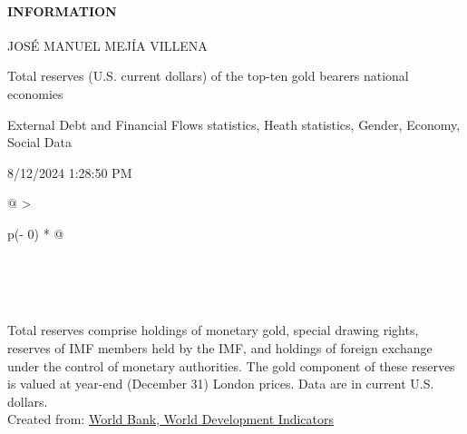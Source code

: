 \documentclass[
]{article}
\providecommand{\tightlist}{%
  \setlength{\itemsep}{0pt}\setlength{\parskip}{0pt}}
\newenvironment{LTR}{\beginL}{\endL}
\begin{document}
\begin{itemize}
  \hypertarget{infoLinkDesc}{}
  \hypertarget{information}{%
  \paragraph{\texorpdfstring{INFORMATION
  {}}{INFORMATION }}\label{information}}

  \hypertarget{reportDescription}{}
  \begin{description}
  \tightlist
  \item[Created by]
  JOSÉ MANUEL MEJÍA VILLENA
  \item[Description]
  Total reserves (U.S. current dollars) of the top-ten gold bearers
  national economies
  \item[Tags]
  External Debt and Financial Flows statistics, Heath statistics,
  Gender, Economy, Social Data
  \item[Last Updated]
  8/12/2024 1:28:50 PM
  \end{description}
\end{itemize}

\protect\hypertarget{fullScreen}{\href{javascript:void(0)}{}}

\begin{longtable}[]{@{}
  >{\raggedright\arraybackslash}p{(\columnwidth - 0\tabcolsep) * }@{}}
\toprule\noalign{}
\endhead
\bottomrule\noalign{}
\endlastfoot
\begin{minipage}[t]{\linewidth}\raggedright
\hypertarget{REPORT_PREVIEW_divdropdown}{}
\end{minipage} \\
 \\
\begin{minipage}[t]{\linewidth}\raggedright
\hypertarget{container}{}
\begin{LTR}
\end{LTR}
\end{minipage} \\
\protect\hypertarget{REPORT_PREVIEW_lblXAxis}{}{}
\protect\hypertarget{REPORT_PREVIEW_lblFooter}{}{Total reserves comprise
holdings of monetary gold, special drawing rights, reserves of IMF
members held by the IMF, and holdings of foreign exchange under the
control of monetary authorities. The gold component of these reserves is
valued at year-end (December 31) London prices. Data are in current U.S.
dollars.} \\
\protect\hypertarget{REPORT_PREVIEW_sReportSource}{}{Created from:}
\protect\hypertarget{REPORT_PREVIEW_hplDatabaseName}{\href{javascript:Shared(\textquotesingle{}/Total-reserves-(U.S.-current-dollars)/id/c09d9f3e\textquotesingle{});}{World
Bank, World Development Indicators}} \\
\textbf{} \protect\hypertarget{REPORT_PREVIEW_sDisclaimerMsg}{}{ } \\
\end{longtable}
\end{document}
